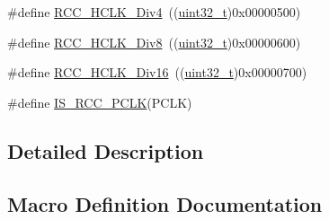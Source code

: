 \begin{DoxyCompactItemize}
\item 
\#define \hyperlink{group___a_p_b1___a_p_b2__clock__source_gafd8cf0e32a3ea5648cdc054766bc2017}{R\+C\+C\+\_\+\+H\+C\+L\+K\+\_\+\+Div4}~((\hyperlink{_p_e___types_8h_a33594304e786b158f3fb30289278f5af}{uint32\+\_\+t})0x00000500)
\item 
\#define \hyperlink{group___a_p_b1___a_p_b2__clock__source_gab2e2b6e0b8fe22d6638b672918b22097}{R\+C\+C\+\_\+\+H\+C\+L\+K\+\_\+\+Div8}~((\hyperlink{_p_e___types_8h_a33594304e786b158f3fb30289278f5af}{uint32\+\_\+t})0x00000600)
\item 
\#define \hyperlink{group___a_p_b1___a_p_b2__clock__source_ga6353aaa0b302fdd5d946fd21756e2273}{R\+C\+C\+\_\+\+H\+C\+L\+K\+\_\+\+Div16}~((\hyperlink{_p_e___types_8h_a33594304e786b158f3fb30289278f5af}{uint32\+\_\+t})0x00000700)
\item 
\#define \hyperlink{group___a_p_b1___a_p_b2__clock__source_gab70f1257ea47c1da4def8e351af4d9f2}{I\+S\+\_\+\+R\+C\+C\+\_\+\+P\+C\+LK}(P\+C\+LK)
\end{DoxyCompactItemize}


\subsection{Detailed Description}


\subsection{Macro Definition Documentation}
